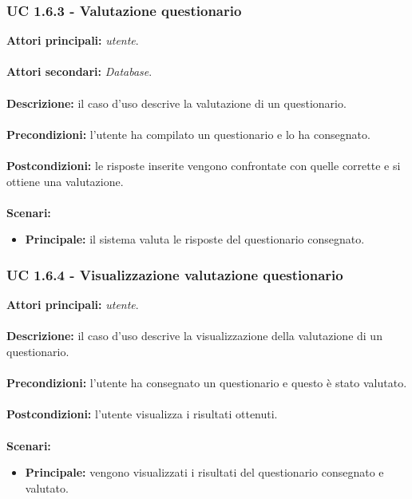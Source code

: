 \documentclass[a4paper,11pt]{article}
\begin{document}
\subsubsection{UC 1.6.3 - Valutazione questionario}

\textbf{Attori principali:} \textit{utente}.\\
\ \\
\textbf{Attori secondari:} \textit{Database}.\\
\\
\textbf{Descrizione:} il caso d'uso descrive la valutazione di un questionario. \\
\\
\textbf{Precondizioni:} l'utente ha compilato un questionario e lo ha consegnato.\\
\\
\textbf{Postcondizioni:} le risposte inserite vengono confrontate con quelle corrette e si ottiene una valutazione. \\
\\
\textbf{Scenari:}
\begin{itemize}
\item \textbf{Principale:} il sistema valuta le risposte del questionario consegnato.
\end{itemize}
\vspace{6 mm}
\subsubsection{UC 1.6.4 - Visualizzazione valutazione questionario}

\textbf{Attori principali:} \textit{utente}.\\
\\
\textbf{Descrizione:} il caso d'uso descrive la visualizzazione della valutazione di un questionario. \\
\\
\textbf{Precondizioni:} l'utente ha consegnato un questionario e questo è stato valutato.\\
\\
\textbf{Postcondizioni:} l'utente visualizza i risultati ottenuti. \\
\\
\textbf{Scenari:}
\begin{itemize}
\item \textbf{Principale:} vengono visualizzati i risultati del questionario consegnato e valutato.
\end{itemize}

\newpage
\end{document}

